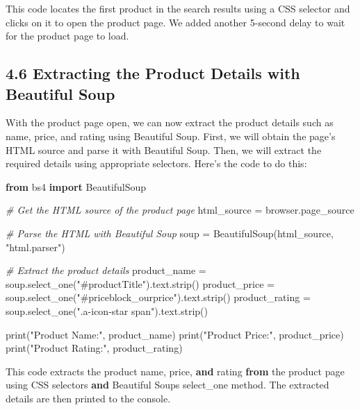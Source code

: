 \documentclass[
  paper=a4,
  ,captions=tableheading
]{scrartcl}
\newenvironment{Shaded}{}{}
\newcommand{\BuiltInTok}[1]{\textcolor[rgb]{0.00,0.50,0.00}{#1}}
\newcommand{\CommentTok}[1]{\textcolor[rgb]{0.38,0.63,0.69}{\textit{#1}}}
\newcommand{\ImportTok}[1]{\textcolor[rgb]{0.00,0.50,0.00}{\textbf{#1}}}
\newcommand{\KeywordTok}[1]{\textcolor[rgb]{0.00,0.44,0.13}{\textbf{#1}}}
\newcommand{\NormalTok}[1]{#1}
\newcommand{\OperatorTok}[1]{\textcolor[rgb]{0.40,0.40,0.40}{#1}}
\newcommand{\StringTok}[1]{\textcolor[rgb]{0.25,0.44,0.63}{#1}}
\begin{document}
This code locates the first product in the search results using a CSS
selector and clicks on it to open the product page. We added another
5-second delay to wait for the product page to load.

\hypertarget{extracting-the-product-details-with-beautiful-soup}{%
\subsection{4.6 Extracting the Product Details with Beautiful
Soup}\label{extracting-the-product-details-with-beautiful-soup}}

With the product page open, we can now extract the product details such
as name, price, and rating using Beautiful Soup. First, we will obtain
the page's HTML source and parse it with Beautiful Soup. Then, we will
extract the required details using appropriate selectors. Here's the
code to do this:

\begin{Shaded}
\begin{Highlighting}[]
\ImportTok{from}\NormalTok{ bs4 }\ImportTok{import}\NormalTok{ BeautifulSoup}

\CommentTok{\# Get the HTML source of the product page}
\NormalTok{html\_source }\OperatorTok{=}\NormalTok{ browser.page\_source}

\CommentTok{\# Parse the HTML with Beautiful Soup}
\NormalTok{soup }\OperatorTok{=}\NormalTok{ BeautifulSoup(html\_source, }\StringTok{"html.parser"}\NormalTok{)}

\CommentTok{\# Extract the product details}
\NormalTok{product\_name }\OperatorTok{=}\NormalTok{ soup.select\_one(}\StringTok{"\#productTitle"}\NormalTok{).text.strip()}
\NormalTok{product\_price }\OperatorTok{=}\NormalTok{ soup.select\_one(}\StringTok{"\#priceblock\_ourprice"}\NormalTok{).text.strip()}
\NormalTok{product\_rating }\OperatorTok{=}\NormalTok{ soup.select\_one(}\StringTok{".a{-}icon{-}star span"}\NormalTok{).text.strip()}

\BuiltInTok{print}\NormalTok{(}\StringTok{"Product Name:"}\NormalTok{, product\_name)}
\BuiltInTok{print}\NormalTok{(}\StringTok{"Product Price:"}\NormalTok{, product\_price)}
\BuiltInTok{print}\NormalTok{(}\StringTok{"Product Rating:"}\NormalTok{, product\_rating)}

\NormalTok{This code extracts the product name, price, }\KeywordTok{and}\NormalTok{ rating }\ImportTok{from}\NormalTok{ the product page using CSS selectors }\KeywordTok{and}\NormalTok{ Beautiful Soup}\StringTok{\textquotesingle{}s select\_one method. The extracted details are then printed to the console.}
\end{Highlighting}
\end{Shaded}
\end{document}
